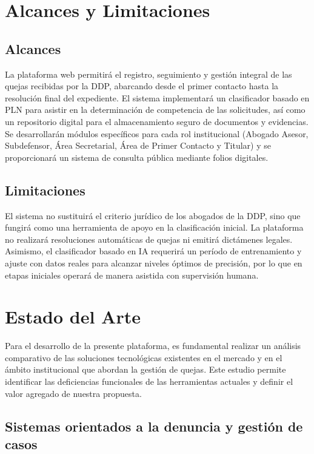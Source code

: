 \section{Alcances y Limitaciones}

    \subsection{Alcances}
    
    La plataforma web permitirá el registro, seguimiento y gestión integral de las quejas recibidas por la DDP, abarcando desde el primer contacto hasta la resolución final del expediente. El sistema implementará un clasificador basado en PLN para asistir en la determinación de competencia de las solicitudes, así como un repositorio digital para el almacenamiento seguro de documentos y evidencias. Se desarrollarán módulos específicos para cada rol institucional (Abogado Asesor, Subdefensor, Área Secretarial, Área de Primer Contacto y Titular) y se proporcionará un sistema de consulta pública mediante folios digitales.
    
    \subsection{Limitaciones}
    
    El sistema no sustituirá el criterio jurídico de los abogados de la DDP, sino que fungirá como una herramienta de apoyo en la clasificación inicial. La plataforma no realizará resoluciones automáticas de quejas ni emitirá dictámenes legales. Asimismo, el clasificador basado en IA requerirá un período de entrenamiento y ajuste con datos reales para alcanzar niveles óptimos de precisión, por lo que en etapas iniciales operará de manera asistida con supervisión humana.

\section{Estado del Arte}

    Para el desarrollo de la presente plataforma, es fundamental realizar un análisis comparativo de las soluciones tecnológicas existentes en el mercado y en el ámbito institucional que abordan la gestión de quejas. Este estudio permite identificar las deficiencias funcionales de las herramientas actuales y definir el valor agregado de nuestra propuesta.
    
    \subsection{Sistemas orientados a la denuncia y gestión de casos}
    
